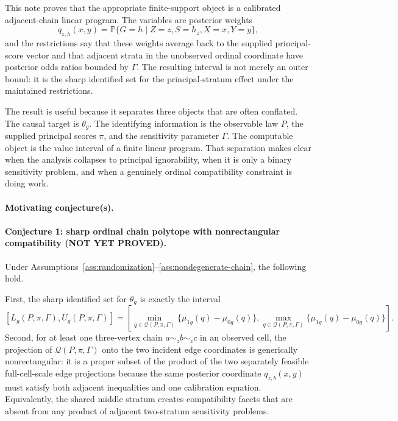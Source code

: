 \documentclass[11pt]{article}
\renewcommand{\Pr}{\mathbb{P}}
\theoremstyle{definition}
\theoremstyle{plain}
\theoremstyle{remark}
\begin{document}
This note proves that the appropriate finite-support object is a calibrated
adjacent-chain linear program.  The variables are posterior weights
\[
  q_{z,h}(x,y)
  =
  \Pr\{G=h\mid Z=z,S=h_z,X=x,Y=y\},
\]
and the restrictions say that these weights average back to the supplied
principal-score vector and that adjacent strata in the unobserved ordinal
coordinate have posterior odds ratios bounded by \(\Gamma\).  The resulting
interval is not merely an outer bound: it is the sharp identified set for the
principal-stratum effect under the maintained restrictions.

The result is useful because it separates three objects that are often
conflated.  The causal target is \(\theta_g\).  The identifying information is
the observable law \(P\), the supplied principal scores \(\pi\), and the
sensitivity parameter \(\Gamma\).  The computable object is the value interval
of a finite linear program.  That separation makes clear when the analysis
collapses to principal ignorability, when it is only a binary sensitivity
problem, and when a genuinely ordinal compatibility constraint is doing work.

\paragraph{Motivating conjecture(s).}
\paragraph{Conjecture 1: sharp ordinal chain polytope with nonrectangular compatibility (NOT YET PROVED).}
Under Assumptions~\ref{ass:randomization}--\ref{ass:nondegenerate-chain}, the following hold.

First, the sharp identified set for \(\theta_g\) is exactly the interval
\[
  [L_g(P,\pi,\Gamma),U_g(P,\pi,\Gamma)]
  =
  \left[
  \min_{q\in\mathcal Q(P,\pi,\Gamma)}\{\mu_{1g}(q)-\mu_{0g}(q)\},
  \max_{q\in\mathcal Q(P,\pi,\Gamma)}\{\mu_{1g}(q)-\mu_{0g}(q)\}
  \right].
\]
Second, for at least one three-vertex chain \(a\sim_z b\sim_z c\) in an observed cell, the projection of \(\mathcal Q(P,\pi,\Gamma)\) onto the two incident edge coordinates is generically nonrectangular: it is a proper subset of the product of the two separately feasible full-cell-scale edge projections because the same posterior coordinate \(q_{z,b}(x,y)\) must satisfy both adjacent inequalities and one calibration equation.  Equivalently, the shared middle stratum creates compatibility facets that are absent from any product of adjacent two-stratum sensitivity problems.
\end{document}
